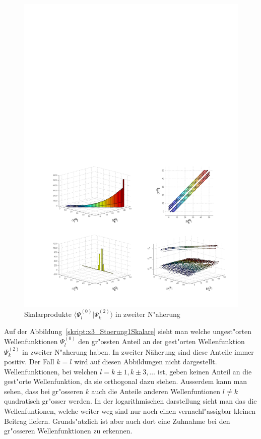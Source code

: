 \begin{refsection}
\begin{figure}[h]	%
\centering
\includegraphics[width=1.0\textwidth]{anharmonisch/images/x3/Stoerung2Skalare.pdf}
\caption{Skalarprodukte $\langle\Psi_l^{(0)}|\Psi_k^{(2)}\rangle$ in zweiter N"aherung
\label{skript:x3_Stoerung2Skalare}}
\end{figure}

Auf der Abbildung~\ref{skript:x3_Stoerung1Skalare} sieht man welche ungest"orten Wellenfunktionen $\Psi_l^{(0)}$ den gr"ossten Anteil an der gest"orten Wellenfunktion $\Psi_k^{(2)}$ in zweiter N"aherung haben. In zweiter Näherung sind diese Anteile immer positiv. Der Fall $k=l$ wird auf diesen Abbildungen nicht dargestellt.  Wellenfunktionen, bei welchen $l=k\pm 1,k\pm 3,\dots$ ist, geben keinen Anteil an die gest"orte Wellenfunktion, da sie orthogonal dazu stehen. Ausserdem kann man sehen, dass bei gr"osseren $k$ auch die Anteile anderen Wellenfuntionen $l\neq k$ quadratisch gr"osser werden. In der logarithmischen darstellung sieht man das die Wellenfuntionen, welche weiter weg sind nur noch einen vernachl"assigbar kleinen Beitrag liefern. Grunds"atzlich ist aber auch dort eine Zuhnahme bei den gr"osseren Wellenfunktionen zu erkennen.


\end{refsection}
